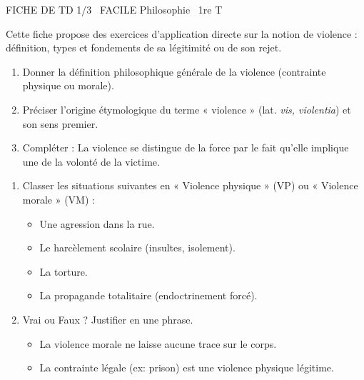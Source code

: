 \documentclass[11pt]{article}
\begin{document}
\pagestyle{empty}
\setlength{\parindent}{0pt}
\setlength{\parskip}{4pt}

\begin{tcolorbox}[
    enhanced,
    colback=popink,
    colframe=popink,
    arc=10pt,
    boxrule=0pt,
    left=12pt, right=12pt, top=9pt, bottom=9pt
]
{\color{white}\popxbold\small FICHE DE TD 1/3 \textbullet\ FACILE \hfill Philosophie \textbullet\ 1re T\par}
\end{tcolorbox}
\vspace{4pt}

Cette fiche propose des exercices d'application directe sur la notion de violence : définition, types et fondements de sa légitimité ou de son rejet.


\begin{exercice}
\begin{enumerate}
    \item Donner la définition philosophique générale de la violence (contrainte physique ou morale).
    \item Préciser l'origine étymologique du terme « violence » (lat. \textit{vis, violentia}) et son sens premier.
    \item Compléter : La violence se distingue de la force par le fait qu'elle implique une \underline{\hspace{5cm}} de la volonté de la victime.
\end{enumerate}
\end{exercice}

\begin{exercice}
\begin{enumerate}
    \item Classer les situations suivantes en « Violence physique » (VP) ou « Violence morale » (VM) :
    \begin{itemize}
        \item Une agression dans la rue.
        \item Le harcèlement scolaire (insultes, isolement).
        \item La torture.
        \item La propagande totalitaire (endoctrinement forcé).
    \end{itemize}
    \item Vrai ou Faux ? Justifier en une phrase.
    \begin{itemize}
        \item La violence morale ne laisse aucune trace sur le corps.
        \item La contrainte légale (ex: prison) est une violence physique légitime.
    \end{itemize}
\end{enumerate}
\end{exercice}
\end{document}
